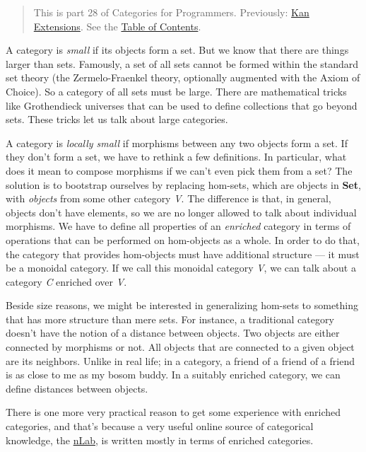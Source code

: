 \begin{quote}
This is part 28 of Categories for Programmers. Previously:
\href{https://bartoszmilewski.com/2017/04/17/kan-extensions/}{Kan
Extensions}. See the
\href{https://bartoszmilewski.com/2014/10/28/category-theory-for-programmers-the-preface/}{Table
of Contents}.
\end{quote}

A category is \emph{small} if its objects form a set. But we know that
there are things larger than sets. Famously, a set of all sets cannot be
formed within the standard set theory (the Zermelo-Fraenkel theory,
optionally augmented with the Axiom of Choice). So a category of all
sets must be large. There are mathematical tricks like Grothendieck
universes that can be used to define collections that go beyond sets.
These tricks let us talk about large categories.

A category is \emph{locally small} if morphisms between any two objects
form a set. If they don't form a set, we have to rethink a few
definitions. In particular, what does it mean to compose morphisms if we
can't even pick them from a set? The solution is to bootstrap ourselves
by replacing hom-sets, which are objects in \textbf{Set}, with
\emph{objects} from some other category \emph{V}. The difference is
that, in general, objects don't have elements, so we are no longer
allowed to talk about individual morphisms. We have to define all
properties of an \emph{enriched} category in terms of operations that
can be performed on hom-objects as a whole. In order to do that, the
category that provides hom-objects must have additional structure --- it
must be a monoidal category. If we call this monoidal category \emph{V},
we can talk about a category \emph{C} enriched over \emph{V}.

Beside size reasons, we might be interested in generalizing hom-sets to
something that has more structure than mere sets. For instance, a
traditional category doesn't have the notion of a distance between
objects. Two objects are either connected by morphisms or not. All
objects that are connected to a given object are its neighbors. Unlike
in real life; in a category, a friend of a friend of a friend is as
close to me as my bosom buddy. In a suitably enriched category, we can
define distances between objects.

There is one more very practical reason to get some experience with
enriched categories, and that's because a very useful online source of
categorical knowledge, the \href{https://ncatlab.org/}{nLab}, is written
mostly in terms of enriched categories.

